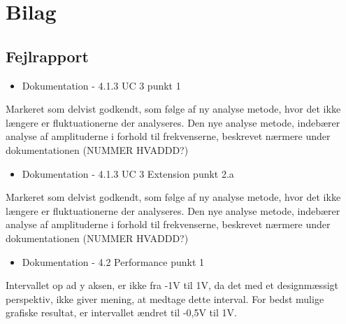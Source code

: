 \chapter{Bilag}
\section{Fejlrapport}
\begin{itemize}
	\item Dokumentation - 4.1.3 UC 3 punkt 1 
\end{itemize}
Markeret som delvist godkendt, som følge af ny analyse metode, hvor det ikke længere er fluktuationerne der analyseres. Den nye analyse metode, indebærer analyse af amplituderne i forhold til frekvenserne, beskrevet nærmere under dokumentationen (NUMMER HVADDD?)
\begin{itemize}
	\item Dokumentation - 4.1.3 UC 3 Extension punkt 2.a 
\end{itemize}
Markeret som delvist godkendt, som følge af ny analyse metode, hvor det ikke længere er fluktuationerne der analyseres. Den nye analyse metode, indebærer analyse af amplituderne i forhold til frekvenserne, beskrevet nærmere under dokumentationen (NUMMER HVADDD?)
\begin{itemize}
	\item Dokumentation - 4.2 Performance punkt 1
\end{itemize}
Intervallet op ad y aksen, er ikke fra -1V til 1V, da det med et designmæssigt perspektiv, ikke giver mening, at medtage dette interval. For bedst mulige grafiske resultat, er intervallet ændret til -0,5V til 1V.
